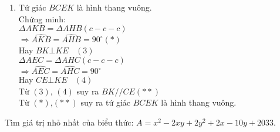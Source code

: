 \begin{ex}
{\begin{enumerate}
$\Rightarrow AN$ là đường cao đồng thời là đường phân giác của $\Delta AHE$\\
$\Rightarrow \widehat{EAH}=2\widehat{NAH}~~~~(2)$\\
Từ $(1)$ và $(2)$ $K,A,E$ thẳng hàng.\\
Mà $AK=AE$\\
$\Rightarrow A$ là trung điểm của $KE$.
\item Tứ giác $BCEK$ là hình thang vuông.\\
Chứng minh:\\
$\Delta AKB=\Delta AHB\left(c-c-c\right)$\\
$\Rightarrow \widehat{AKB}=\widehat{AHB}=90^\circ\left(*\right)$\\
Hay $BK\bot KE~~~~(3)$\\
$\Delta AEC=\Delta AHC\left(c-c-c\right)$\\
$\Rightarrow \widehat{AEC}=\widehat{AHC}=90^\circ$\\
Hay $CE\bot KE~~~~(4)$\\
Từ $(3)$, $(4)$ suy ra $BK//CE\left(**\right)$\\
Từ $\left(*\right)$,$\left(**\right)$ suy ra tứ giác $BCEK$ là hình thang vuông.
\end{enumerate}
}
\end{ex}
\begin{ex}%
	Tìm giá trị nhỏ nhất của biểu thức:
$A=x^2-2xy+2y^2+2x-10y+2033$.
\end{ex}
